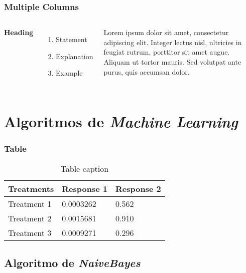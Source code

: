 \documentclass{beamer}
\begin{document}
\begin{frame}
\frametitle{Multiple Columns}
\begin{columns}[c] %

\textbf{Heading}
\begin{enumerate}
\item Statement
\item Explanation
\item Example
\end{enumerate}

Lorem ipsum dolor sit amet, consectetur adipiscing elit. Integer lectus nisl, ultricies in feugiat rutrum, porttitor sit amet augue. Aliquam ut tortor mauris. Sed volutpat ante purus, quis accumsan dolor.

\end{columns}
\end{frame}

\section{Algoritmos de \textit{Machine Learning}}

\begin{frame}
\frametitle{Table}
\begin{table}
\begin{tabular}{l l l}
\toprule
\textbf{Treatments} & \textbf{Response 1} & \textbf{Response 2}\\
\midrule
Treatment 1 & 0.0003262 & 0.562 \\
Treatment 2 & 0.0015681 & 0.910 \\
Treatment 3 & 0.0009271 & 0.296 \\
\bottomrule
\end{tabular}
\caption{Table caption}
\end{table}
\end{frame}

\subsection{Algoritmo de \textit{NaiveBayes}}
\end{document}
